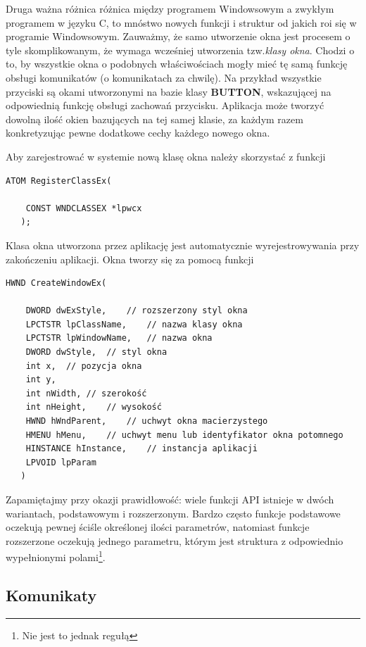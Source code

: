 Druga ważna różnica różnica między programem Windowsowym a zwykłym programem w języku C, 
to mnóstwo nowych funkcji i struktur od jakich roi się w programie Windowsowym. Zauważmy, że samo
utworzenie okna jest procesem o tyle skomplikowanym, że wymaga wcześniej utworzenia tzw.{\em klasy okna}.
Chodzi o to, by wszystkie okna o podobnych właściwościach mogły mieć tę samą funkcję obsługi komunikatów
(o komunikatach za chwilę). 
Na przykład wszystkie przyciski są okami utworzonymi na bazie klasy {\bf BUTTON}, 
wskazującej na odpowiednią funkcję
obsługi zachowań przycisku. Aplikacja może tworzyć dowolną ilość okien bazujących na tej samej klasie, 
za każdym razem konkretyzując pewne dodatkowe cechy każdego nowego okna.

Aby zarejestrować w systemie nową klasę okna należy skorzystać z funkcji 

\begin{scriptsize}
\begin{verbatim}
ATOM RegisterClassEx(

    CONST WNDCLASSEX *lpwcx	
   );
\end{verbatim}
\end{scriptsize}

Klasa okna utworzona przez aplikację jest automatycznie wyrejestrowywania przy zakończeniu
aplikacji. Okna tworzy się za pomocą funkcji 

\begin{scriptsize}
\begin{verbatim}
HWND CreateWindowEx(

    DWORD dwExStyle,	// rozszerzony styl okna
    LPCTSTR lpClassName,	// nazwa klasy okna
    LPCTSTR lpWindowName,	// nazwa okna
    DWORD dwStyle,	// styl okna
    int x,	// pozycja okna
    int y,	
    int nWidth,	// szerokość
    int nHeight,	// wysokość
    HWND hWndParent,	// uchwyt okna macierzystego
    HMENU hMenu,	// uchwyt menu lub identyfikator okna potomnego
    HINSTANCE hInstance,	// instancja aplikacji
    LPVOID lpParam 	
   )
\end{verbatim}
\end{scriptsize}

Zapamiętajmy przy okazji prawidłowość: wiele funkcji API istnieje w dwóch wariantach,
podstawowym i rozszerzonym. Bardzo często funkcje podstawowe oczekują pewnej ściśle określonej ilości 
parametrów, natomiast funkcje rozszerzone oczekują jednego parametru, którym jest struktura z 
odpowiednio wypełnionymi polami\footnote{Nie jest to jednak regułą}. 

\subsection{Komunikaty}

